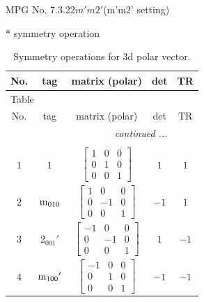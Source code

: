 \documentclass[fleqn,8pt]{jsarticle}
\begin{document}
\setcounter{MaxMatrixCols}{32}

\renewcommand{\tablename}{Table~}
\renewcommand{\figurename}{Figure~}
\begin{center}
\LARGE
MPG No. 7.3.22\quad$m'm2'$\quad(m'm2' setting)
\end{center}
* symmetry operation
\renewcommand{\arraystretch}{1.3}
\begin{longtable}{ccccc}
\caption{Symmetry operations for 3d polar vector.}
 \\
 \hline \hline
No. & tag & matrix (polar) & det & TR \\ \hline \endfirsthead

\multicolumn{4}{l}{\tablename\ \thetable{}} \\
 \hline \hline
No. & tag & matrix (polar) & det & TR \\ \hline \endhead

 \hline \hline
\multicolumn{4}{r}{\footnotesize\it continued ...} \\ \endfoot

 \hline \hline
\multicolumn{4}{r}{} \\ \endlastfoot

$ 1 $ & $ 1 $ & $ \begin{bmatrix} 1 & 0 & 0 \\ 0 & 1 & 0 \\ 0 & 0 & 1 \end{bmatrix} $ & $ 1 $ & $ 1 $ \\ \hline
$ 2 $ & $ {\rm m}_{010} $ & $ \begin{bmatrix} 1 & 0 & 0 \\ 0 & -1 & 0 \\ 0 & 0 & 1 \end{bmatrix} $ & $ -1 $ & $ 1 $ \\ \hline
$ 3 $ & $ 2{}_{001}{}' $ & $ \begin{bmatrix} -1 & 0 & 0 \\ 0 & -1 & 0 \\ 0 & 0 & 1 \end{bmatrix} $ & $ 1 $ & $ -1 $ \\ \hline
$ 4 $ & $ {\rm m}_{100}{}' $ & $ \begin{bmatrix} -1 & 0 & 0 \\ 0 & 1 & 0 \\ 0 & 0 & 1 \end{bmatrix} $ & $ -1 $ & $ -1 $ \\
\end{longtable}
\end{document}
